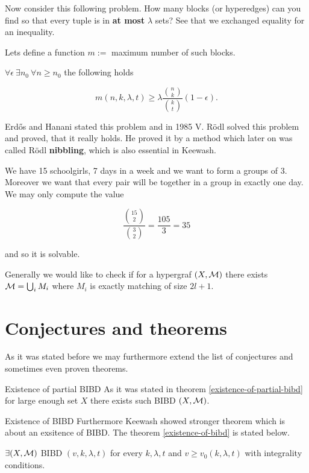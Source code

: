 Now consider this following problem. How many blocks (or hyperedges) can you find so that every tuple is in \textbf{at most} $\lambda$ sets? See that we exchanged equality for an inequality.

\begin{defn}
	Lets define a function $m :=$ maximum number of such blocks.
\end{defn}

\begin{thm}
	$\forall \epsilon \ \exists n_0 \ \forall n \geq n_0$  the following holds
	
	$$
	m(n,k,\lambda,t) \geq \lambda \frac{\binom{n}{k}}{\binom{k}{t}}(1 - \epsilon).
	$$
	\label{existence-of-partial-bibd}
\end{thm}

Erd\H os and Hanani stated this problem and in 1985 V. Rödl solved this problem and proved, that it really holds. He proved it by a method which later on was called Rödl \textbf{nibbling}, which is also essential in Keewash.

\begin{example}
	We have 15 schoolgirls, 7 days in a week and we want to form a groups of 3. Moreover we want that every pair will be together in a group in exactly one day. We may only compute the value
	
	$$
	\frac{\binom{15}{2}}{\binom{3}{2}} = \frac{105}{3} = 35
	$$
	
	\noindent and so it is solvable.
\end{example}

Generally we would like to check if for a hypergraf $(X, \mathcal{M})$ there exists $\mathcal{M} = \bigcup_i M_i$ where $M_i$ is exactly matching of size $2l+1$.

\section{Conjectures and theorems}

As it was stated before we may furthermore extend the list of conjectures and sometimes even proven theorems.

\begin{topic}{Existence of partial BIBD}
	As it was stated in theorem \ref{existence-of-partial-bibd} for large enough set $X$ there exists such BIBD $(X, \mathcal{M})$.
\end{topic}

\begin{topic}{Existence of BIBD}
	Furthermore Keewash showed stronger theorem which is about an exsitence of BIBD. The theorem \ref{existence-of-bibd} is stated below.
	
	\begin{thm}
		$\exists (X, \mathcal{M})$ BIBD $(v,k,\lambda,t)$ for every $k,\lambda,t$ and $v \geq v_0 (k,\lambda,t)$ with integrality conditions.
		\label{existence-of-bibd}
	\end{thm}
\end{topic}

